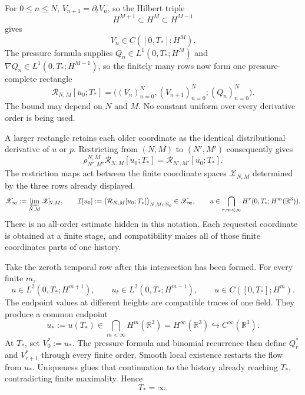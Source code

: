 For \(0\le n\le N\), \(V_{n+1}=\partial_tV_n\), so the Hilbert triple
\[
 H^{M+1}\subset H^M\subset H^{M-1}
\]
gives
\[
 V_n\in C([0,T_*];H^M).
\]
The pressure formula supplies
\(Q_n\in L^1(0,T_*;H^M)\) and
\(\nabla Q_n\in L^1(0,T_*;H^{M-1})\), so the finitely many rows now form one
pressure-complete rectangle
\[
 \mathcal R_{N,M}[u_0;T_*]
 =\bigl((V_n)_{n=0}^{N},(V_{n+1})_{n=0}^{N};(Q_n)_{n=0}^{N}\bigr).
\]
The bound may depend on \(N\) and \(M\).  No constant uniform over every
derivative order is being used.

A larger rectangle retains each older coordinate as the identical
distributional derivative of \(u\) or \(p\).  Restricting from
\((N,M)\) to \((N',M')\) consequently gives
\[
 \rho_{N',M'}^{N,M}\mathcal R_{N,M}[u_0;T_*]
 =\mathcal R_{N',M'}[u_0;T_*].
\]
The restriction maps act between the finite coordinate spaces
\(\mathscr X_{N,M}\) determined by the three rows already displayed.
\[
 \mathscr X_\infty:=\varprojlim_{N,M}\mathscr X_{N,M},
 \qquad
 \mathcal I[u_0]
 :=\bigl(\mathcal R_{N,M}[u_0;T_*]\bigr)_{N,M\in\mathbb N_0}
 \in\mathscr X_\infty,
 \qquad
 u\in\bigcap_{r,m<\infty}H^r(0,T_*;H^m(\mathbb R^3)).
\]
There is no all-order estimate hidden in this notation.  Each requested
coordinate is obtained at a finite stage, and compatibility makes all of
those finite coordinates parts of one history.

Take the zeroth temporal row after this intersection has been formed.  For
every finite \(m\),
\[
 u\in L^2(0,T_*;H^{m+1}),
 \qquad
 u_t\in L^2(0,T_*;H^{m-1}),
 \qquad
 u\in C([0,T_*];H^m).
\]
The endpoint values at different heights are compatible traces of one field.
They produce a common endpoint
\[
 u_*:=u(T_*)\in\bigcap_{m<\infty}H^m(\mathbb R^3)
 =H^\infty(\mathbb R^3)
 \hookrightarrow C^\infty(\mathbb R^3).
\]
At \(T_*\), set \(V_0^*:=u_*\).  The pressure formula and binomial recurrence
then define \(Q_r^*\) and \(V_{r+1}^*\) through every finite order.  Smooth
local existence restarts the flow from \(u_*\).  Uniqueness glues that
continuation to the history already reaching \(T_*\), contradicting finite
maximality.
Hence
\[
 T_*=\infty.
\]

